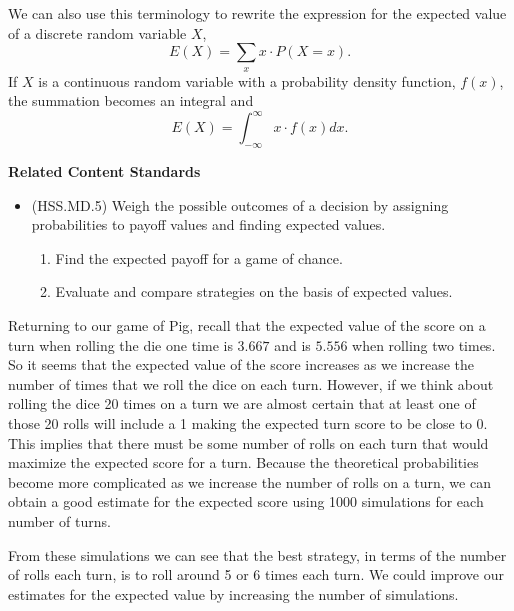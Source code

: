 \documentclass[
]{book}
\providecommand{\tightlist}{%
  \setlength{\itemsep}{0pt}\setlength{\parskip}{0pt}}
\newenvironment{standards}{}{}
\theoremstyle{definition}
\theoremstyle{definition}
\theoremstyle{definition}
\theoremstyle{definition}
\theoremstyle{remark}
\begin{document}
We can also use this terminology to rewrite the expression for the expected value of a discrete random variable \(X\),
\[E(X) = \sum_{x} x\cdot P(X=x).\]
If \(X\) is a continuous random variable with a probability density function, \(f(x)\), the summation becomes an integral and
\[E(X) = \int_{-\infty}^\infty x \cdot f(x) dx.\]

\begin{standards}

\begin{center}
\textbf{Related Content Standards}

\end{center}

\begin{itemize}
\item
  (HSS.MD.5) Weigh the possible outcomes of a decision by assigning probabilities to payoff values and finding expected values.

  \begin{enumerate}
  \def\labelenumi{\alph{enumi}.}
  \tightlist
  \item
    Find the expected payoff for a game of chance.
  \item
    Evaluate and compare strategies on the basis of expected values.
  \end{enumerate}
\end{itemize}

\end{standards}

Returning to our game of Pig, recall that the expected value of the score on a turn when rolling the die one time is \(3.667\) and is \(5.556\) when rolling two times. So it seems that the expected value of the score increases as we increase the number of times that we roll the dice on each turn. However, if we think about rolling the dice 20 times on a turn we are almost certain that at least one of those 20 rolls will include a 1 making the expected turn score to be close to 0. This implies that there must be some number of rolls on each turn that would maximize the expected score for a turn. Because the theoretical probabilities become more complicated as we increase the number of rolls on a turn, we can obtain a good estimate for the expected score using 1000 simulations for each number of turns.

From these simulations we can see that the best strategy, in terms of the number of rolls each turn, is to roll around 5 or 6 times each turn. We could improve our estimates for the expected value by increasing the number of simulations.
\end{document}
